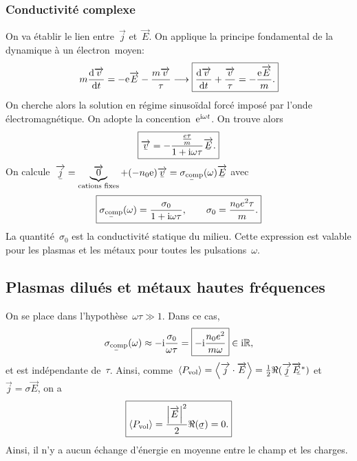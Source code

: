 \subsubsection{Conductivité complexe}
On va établir le lien entre~$\vec{j}$ et~$\vec{E}$. On applique la principe fondamental de la dynamique à un électron~\og moyen\fg:
\begin{equation*}
    m\frac{\mathrm{d}\protect\overrightarrow{{v}}}{\mathrm{d} t}=-\mathrm{e}\protect\overrightarrow{{E}}-\frac{m\protect\overrightarrow{{v}}}{\tau}\longrightarrow \boxed{
        \frac{\mathrm{d}\protect\overrightarrow{{v}}}{\mathrm{d} t}+\frac{\protect\overrightarrow{{v}}}{\tau}=-\frac{\mathrm{e}\protect\overrightarrow{{E}}}{m}.
    }
\end{equation*}
On cherche alors la solution en régime sinusoïdal forcé imposé par l'onde électromagnétique. On adopte la concention~$\mathrm{e}^{\mathrm{i}\omega t}$. On trouve alors
\begin{equation*}
    \boxed{
        \ubar{\vec{v}}=-\frac{\frac{e\tau}{m}}{1+\rmi\omega\tau}\ubar{\vec{E}}.
    }
\end{equation*}
On calcule~$\ubar{\vec{j}}=\underbrace{\vec{0}}_{\text{cations fixes}}+(-n_0\rme)\ubar{\vec{v}}=\ubar{\sigma_{\rm comp}}(\omega)\ubar{\vec{E}}$ avec
\begin{equation*}
    \boxed{
        \ubar{\sigma_{\rm comp}}(\omega)=\frac{\sigma_0}{1+\rmi\omega\tau},\qquad \sigma_{0}=\frac{n_0 e^{2}\tau}{m}.
    }
\end{equation*}
La quantité~$\sigma_0$ est la conductivité statique du milieu. Cette expression est valable pour les plasmas et les métaux pour toutes les pulsations~$\omega$.

\subsection{Plasmas dilués et métaux hautes fréquences}

On se place dans l'hypothèse~$\omega\tau\gg1$. Dans ce cas,
\begin{equation*}
    \ubar{\sigma_{\rm comp}}(\omega)\approx-\rmi\frac{\sigma_0}{\omega\tau}=\boxed{-\rmi\frac{n_0 e^{2}}{m\omega}}\in\rmi\bbR,
\end{equation*}
et est indépendante de~$\tau$. Ainsi, comme~$\left\langle P_{\rm vol}\right\rangle=\left\langle\vec{j}\cdot\vec{E}\right\rangle=\frac{1}{2}\Re(\ubar{\vec{j}}\ubar{\vec{E}^{*}})$ et~$\vec{j}=\sigma\vec{E}$, on a
\begin{equation*}
    \boxed{
        \left\langle P_{\rm vol}\right\rangle=\frac{\left\lvert \vec{E}\right\rvert^{2}}{2}\Re(\ubar{\sigma})=0.
    }
\end{equation*}
Ainsi, il n'y a aucun échange d'énergie en moyenne entre le champ et les charges.

